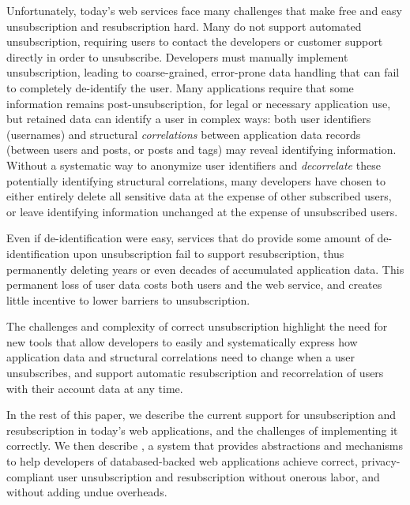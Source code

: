 Unfortunately, today's web services face many challenges that make free and easy unsubscription and
resubscription hard. Many do not support automated unsubscription, requiring users to 
contact the developers or customer support directly in order to unsubscribe.
Developers must manually implement unsubscription, leading to coarse-grained, error-prone data
handling that can fail to completely de-identify the user. Many applications require that some
information remains post-unsubscription, for legal or necessary application use, but retained data
can identify a user in complex ways: both user identifiers (\eg usernames) and structural
\emph{correlations} between application data records (\eg between users and posts, or posts and
tags) may reveal identifying information.  Without a systematic way to anonymize user identifiers
and \emph{decorrelate} these potentially identifying structural correlations, many developers have
chosen to either entirely delete all sensitive data at the expense of other subscribed users, or
leave identifying information unchanged at the expense of unsubscribed users.

Even if de-identification were easy, services that do provide some amount of de-identification upon
unsubscription fail to support resubscription, thus permanently deleting years or even decades of
accumulated application data. This permanent loss of user data costs both users and the web
service, and creates little incentive to lower barriers to unsubscription.  

The challenges and complexity of
correct unsubscription highlight the need for new tools that allow developers to easily and
systematically express how application data and structural correlations need to change when a user
unsubscribes, and support automatic resubscription and recorrelation of users with their account
data at any time.

In the rest of this paper, we describe the current support for unsubscription and resubscription in
today's web applications, and the challenges of implementing it correctly.  We then describe \sys, a
system that provides abstractions and mechanisms to help developers of databased-backed web
applications achieve correct, privacy-compliant user unsubscription and resubscription without
onerous labor, and without adding undue overheads.
